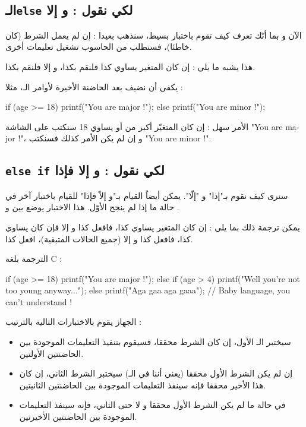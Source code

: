 \subsection{الـ\texttt{else}
لكي نقول : و إلا}

الآن و بما أنّك تعرف كيف تقوم باختبار بسيط، سنذهب بعيدا : إن لم يعمل الشرط (كان خاطئا)، فسنطلب من الحاسوب تشغيل تعليمات أخرى.

هذا يشبه ما يلي : إن كان المتغير يساوي كذا فلنقم بكذا، و إلا فلنقم بكذا.

يكفي أن نضيف
بعد الحاضنة الأخيرة لأوامر الـ،
مثلا :
\begin{Csource}
if (age >= 18)
{
	printf("You are major !");
}
else {
	printf("You are minor !");
}
\end{Csource}

الأمر سهل : إن كان المتغيّر
أكبر من أو يساوي 18 سنكتب على الشاشة 
"\textenglish{You are major !}"،
و إن لم يكن الأمر كذلك فسنكتب 
"\textenglish{You are minor !}".

\subsection{\texttt{else if}
لكي نقول : و إلا فإذا}

سنرى كيف نقوم بـ"إذا" و "إلّا". يمكن أيضاً القيام بـ"و إلاّ فإذا" للقيام باختبار آخر في حالة ما إذا لم ينجح الأوّل. هذا الاختبار يوضع بين
و
.

يمكن ترجمة ذلك بما يلي : إن كان المتغير يساوي كذا، فافعل كذا و إلا فإن كان يساوي كذا، فافعل كذا و إلا (جميع الحالات المتبقية)، افعل كذا.

الترجمة بلغة
\textenglish{C} :

\begin{Csource}
if (age >= 18)
{
	printf("You are major !");
}
else if (age > 4)
{
	printf("Well you're not too young anyway...");
}
else
{
	printf("Aga gaa aga gaaa");
	// Baby language, you can't understand !
}
\end{Csource}

الجهاز يقوم بالاختبارات التالية بالترتيب :
\begin{itemize}
\item سيختبر الـ
الأول، إن كان الشرط محققا، فسيقوم بتنفيذ التعليمات الموجودة بين الحاضنتين الأولتين.
\item إن لم يكن الشرط الأول محققا (يعني أننا في الـ)
سيختبر الشرط الثاني، إن كان هذا الأخير محققا فإنه سينفذ التعليمات الموجودة بين الحاضنتين الثانيتين.
\item في حالة ما لم يكن الشرط الأول محققا و لا حتى الثاني، فإنه سينفذ التعليمات الموجودة بين الحاضنتين الأخيرتين.
\end{itemize}

